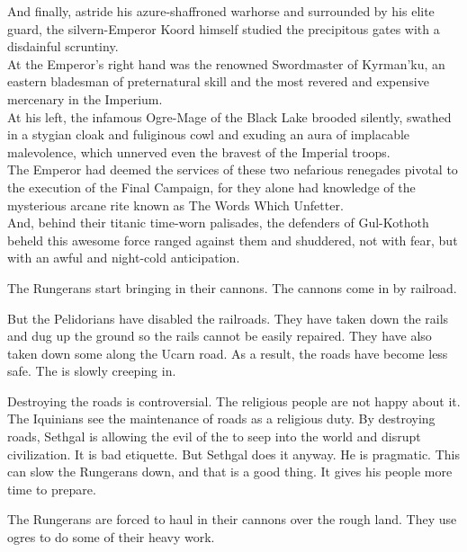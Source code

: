 {  And finally, astride his azure-shaffroned warhorse and surrounded by his elite guard, the silvern-\armoured Emperor Koord himself studied the precipitous gates with a disdainful scruntiny.\\
  At the Emperor's right hand was the renowned Swordmaster of Kyrman'ku, an eastern bladesman of preternatural skill and the most revered and expensive mercenary in the Imperium.\\
  At his left, the infamous Ogre-Mage of the Black Lake brooded silently, swathed in a stygian cloak and fuliginous cowl and exuding an aura of implacable malevolence, which unnerved even the bravest of the Imperial troops.\\
  The Emperor had deemed the services of these two nefarious renegades pivotal to the execution of the Final Campaign, for they alone had knowledge of the mysterious arcane rite known as The Words Which Unfetter.\\
  And, behind their titanic time-worn palisades, the defenders of Gul-Kothoth beheld this awesome force ranged against them and shuddered, not with fear, but with an awful and night-cold anticipation.
}



\begin{comment}
  \section{Cannonade}
\end{comment}
The Rungerans start bringing in their cannons. 
The cannons come in by railroad. 

But the Pelidorians have disabled the railroads. 
They have taken down the rails and dug up the ground so the rails cannot be easily repaired. 
They have also taken down some \eidola along the Ucarn road. 
As a result, the roads have become less safe.
The \wylde is slowly creeping in. 

Destroying the roads is controversial.
The religious people are not happy about it. 
The Iquinians see the maintenance of roads as a religious duty.
By destroying roads, Sethgal is allowing the evil of the \wylde to seep into the world and disrupt civilization.
It is bad etiquette.
But Sethgal does it anyway.
He is pragmatic. 
This can slow the Rungerans down, and that is a good thing. 
It gives his people more time to prepare. 

The Rungerans are forced to haul in their cannons over the rough land. 
They use \nephil ogres to do some of their heavy work.

